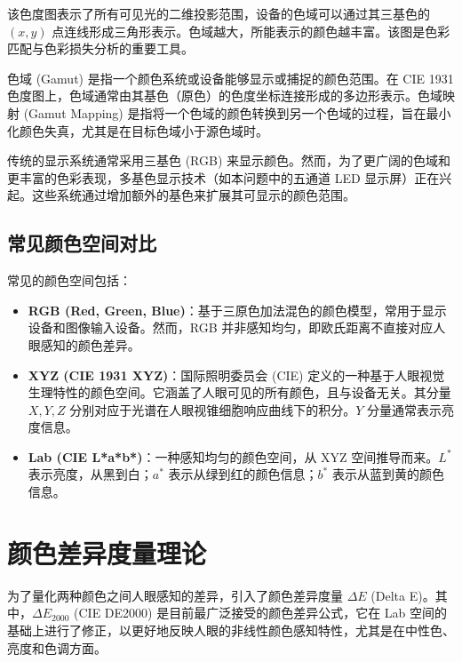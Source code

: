 该色度图表示了所有可见光的二维投影范围，设备的色域可以通过其三基色的 $(x,y)$ 点连线形成三角形表示。色域越大，所能表示的颜色越丰富。该图是色彩匹配与色彩损失分析的重要工具。

色域 (Gamut) 是指一个颜色系统或设备能够显示或捕捉的颜色范围。在 CIE 1931 色度图上，色域通常由其基色（原色）的色度坐标连接形成的多边形表示。色域映射 (Gamut Mapping) 是指将一个色域的颜色转换到另一个色域的过程，旨在最小化颜色失真，尤其是在目标色域小于源色域时。

传统的显示系统通常采用三基色 (RGB) 来显示颜色。然而，为了更广阔的色域和更丰富的色彩表现，多基色显示技术（如本问题中的五通道 LED 显示屏）正在兴起。这些系统通过增加额外的基色来扩展其可显示的颜色范围。

\subsection[\hspace{-2pt}常见颜色空间对比]{{\heiti{} \hspace{-8pt}常见颜色空间对比}}\label{subsection2: 常见颜色空间对比}

常见的颜色空间包括：

\begin{itemize}
    \item \textbf{RGB (Red, Green, Blue)}：基于三原色加法混色的颜色模型，常用于显示设备和图像输入设备。然而，RGB 并非感知均匀，即欧氏距离不直接对应人眼感知的颜色差异。
    \item \textbf{XYZ (CIE 1931 XYZ)}：国际照明委员会 (CIE) 定义的一种基于人眼视觉生理特性的颜色空间。它涵盖了人眼可见的所有颜色，且与设备无关。其分量 $X, Y, Z$ 分别对应于光谱在人眼视锥细胞响应曲线下的积分。$Y$ 分量通常表示亮度信息。
    \item \textbf{Lab (CIE L*a*b*)}：一种感知均匀的颜色空间，从 XYZ 空间推导而来。$L^*$ 表示亮度，从黑到白；$a^*$ 表示从绿到红的颜色信息；$b^*$ 表示从蓝到黄的颜色信息。
\end{itemize}

\section[\hspace{-2pt}颜色差异度量理论]{{\heiti{} \hspace{-8pt}颜色差异度量理论}}\label{section2: 颜色差异度量理论}

为了量化两种颜色之间人眼感知的差异，引入了颜色差异度量 $\Delta E$ (Delta E)\cite{luo2001development}。其中，$\Delta E_{2000}$ (CIE DE2000) 是目前最广泛接受的颜色差异公式\cite{sharma2005ciede2000,YSZL200407020}，它在 Lab 空间的基础上进行了修正，以更好地反映人眼的非线性颜色感知特性，尤其是在中性色、亮度和色调方面。


